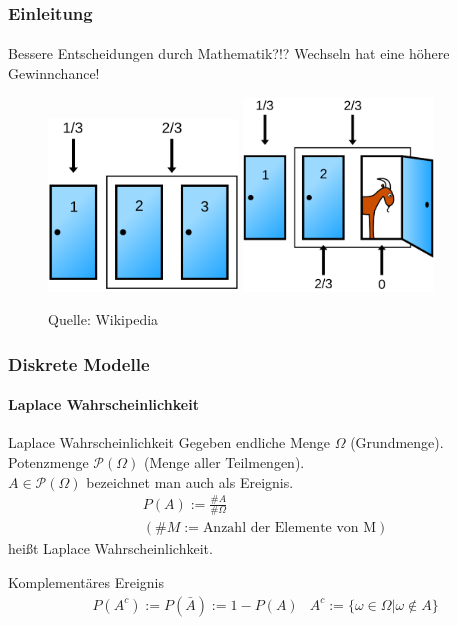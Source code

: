 \documentclass{beamer}
\begin{document}
\begin{frame}
    \frametitle{Einleitung}
\framesubtitle{}

\begin{block}{Bessere Entscheidungen durch Mathematik?!?}
Wechseln hat eine höhere Gewinnchance!
\end{block}

\begin{figure}[htp]
      \centering
    \includegraphics[width=0.45\textwidth]{img/Monty_closed_1}
    \includegraphics[width=0.45\textwidth]{img/Monty_open_1}
      \caption{Quelle: Wikipedia}
\end{figure}

 \end{frame}


\begin{frame}
    \frametitle{Diskrete Modelle}
\framesubtitle{ Laplace Wahrscheinlichkeit}

\begin{block}{Laplace Wahrscheinlichkeit}
Gegeben endliche Menge $\Omega$ (Grundmenge). \\
Potenzmenge  $\mathcal{P}(\Omega)$   (Menge aller Teilmengen).  \\
$A \in \mathcal{P}(\Omega)$ bezeichnet man auch als Ereignis. 
\begin{align*}
& P(A) := \frac{ \#A}{ \# \Omega} \\
 & (\#M := \text{Anzahl der Elemente von M})
\end{align*}
heißt Laplace Wahrscheinlichkeit.
\end{block}

\begin{block}{Komplementäres Ereignis}
\begin{align*}
& P(A^c) := P(\bar{A}) := 1 - P(A)
 & A^c := \{ \omega \in \Omega | \omega \notin A \}
\end{align*}
\end{block}


 \end{frame}
 
\end{document}
